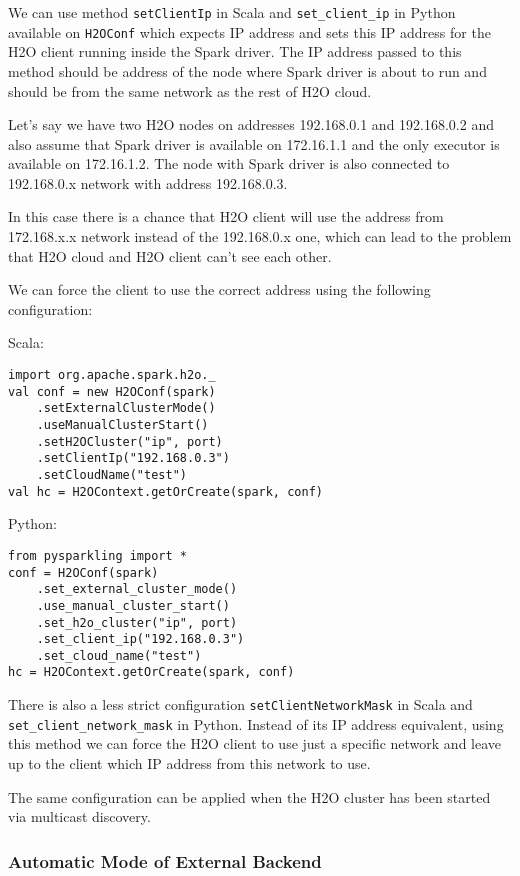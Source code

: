 We can use method \texttt{setClientIp} in Scala and \texttt{set\_client\_ip} in Python available on \texttt{H2OConf} which expects IP address and sets this IP address for the H2O client running inside the Spark driver. The IP address passed to this method should be address of the node where Spark driver is about to run and should be from the same network as the rest of H2O cloud.

Let's say we have two H2O nodes on addresses 192.168.0.1 and 192.168.0.2 and also assume that Spark driver is available on 172.16.1.1 and the only executor is available on 172.16.1.2. The node with Spark driver is also connected to 192.168.0.x network with address 192.168.0.3.

In this case there is a chance that H2O client will use the address from 172.168.x.x network instead of the 192.168.0.x one, which can lead to the problem that H2O cloud and H2O client can't see each other.

We can force the client to use the correct address using the following configuration:

Scala:
\begin{lstlisting}[style=Scala]
import org.apache.spark.h2o._
val conf = new H2OConf(spark)
    .setExternalClusterMode()
    .useManualClusterStart()
    .setH2OCluster("ip", port)
    .setClientIp("192.168.0.3")
    .setCloudName("test")
val hc = H2OContext.getOrCreate(spark, conf)
\end{lstlisting}

Python:
\begin{lstlisting}[style=Python]
from pysparkling import *
conf = H2OConf(spark)
    .set_external_cluster_mode()
    .use_manual_cluster_start()
    .set_h2o_cluster("ip", port)
    .set_client_ip("192.168.0.3")
    .set_cloud_name("test")
hc = H2OContext.getOrCreate(spark, conf)
\end{lstlisting}

There is also a less strict configuration \texttt{setClientNetworkMask} in Scala and \texttt{set\_client\_network\_mask} in Python. Instead of its IP address equivalent, using this method we can force the H2O client to use just a specific network and leave up to the client which IP address from this network to use.

The same configuration can be applied when the H2O cluster has been started via multicast discovery.

\subsubsection{Automatic Mode of External Backend}

